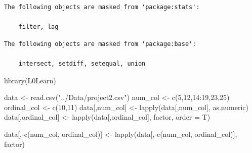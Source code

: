 \documentclass[
  letterpaper,
  DIV=11,
  numbers=noendperiod]{scrartcl}
\newenvironment{Shaded}{\begin{snugshade}}{\end{snugshade}}
\newcommand{\AttributeTok}[1]{\textcolor[rgb]{0.40,0.45,0.13}{#1}}
\newcommand{\DecValTok}[1]{\textcolor[rgb]{0.68,0.00,0.00}{#1}}
\newcommand{\FunctionTok}[1]{\textcolor[rgb]{0.28,0.35,0.67}{#1}}
\newcommand{\NormalTok}[1]{\textcolor[rgb]{0.00,0.23,0.31}{#1}}
\newcommand{\OtherTok}[1]{\textcolor[rgb]{0.00,0.23,0.31}{#1}}
\newcommand{\SpecialCharTok}[1]{\textcolor[rgb]{0.37,0.37,0.37}{#1}}
\newcommand{\StringTok}[1]{\textcolor[rgb]{0.13,0.47,0.30}{#1}}
\begin{document}
\begin{verbatim}
The following objects are masked from 'package:stats':

    filter, lag
\end{verbatim}

\begin{verbatim}
The following objects are masked from 'package:base':

    intersect, setdiff, setequal, union
\end{verbatim}

\begin{Shaded}
\begin{Highlighting}[]
\FunctionTok{library}\NormalTok{(L0Learn)}
\end{Highlighting}
\end{Shaded}

\begin{Shaded}
\begin{Highlighting}[]
\NormalTok{data }\OtherTok{\textless{}{-}} \FunctionTok{read.csv}\NormalTok{(}\StringTok{"../Data/project2.csv"}\NormalTok{)}
\NormalTok{num\_col }\OtherTok{\textless{}{-}} \FunctionTok{c}\NormalTok{(}\DecValTok{5}\NormalTok{,}\DecValTok{12}\NormalTok{,}\DecValTok{14}\SpecialCharTok{:}\DecValTok{19}\NormalTok{,}\DecValTok{23}\NormalTok{,}\DecValTok{25}\NormalTok{)}
\NormalTok{ordinal\_col }\OtherTok{\textless{}{-}} \FunctionTok{c}\NormalTok{(}\DecValTok{10}\NormalTok{,}\DecValTok{11}\NormalTok{)}
\NormalTok{data[,num\_col] }\OtherTok{\textless{}{-}} \FunctionTok{lapply}\NormalTok{(data[,num\_col], as.numeric)}
\NormalTok{data[,ordinal\_col] }\OtherTok{\textless{}{-}} \FunctionTok{lapply}\NormalTok{(data[,ordinal\_col], factor, }\AttributeTok{order =}\NormalTok{ T)}

\NormalTok{data[,}\SpecialCharTok{{-}}\FunctionTok{c}\NormalTok{(num\_col, ordinal\_col)] }\OtherTok{\textless{}{-}} \FunctionTok{lapply}\NormalTok{(data[,}\SpecialCharTok{{-}}\FunctionTok{c}\NormalTok{(num\_col, ordinal\_col)], factor)}
\end{Highlighting}
\end{Shaded}

\begin{Shaded}
\end{Shaded}
\end{document}
